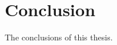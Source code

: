 \chapter{Conclusion}
\label{chp:conclusion}


The conclusions of this thesis.

\printbibliography[heading=subbibintoc,title={References},notcategory=noprint]
